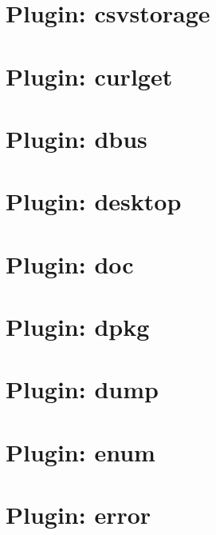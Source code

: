 \documentclass[twoside]{book}
\newcommand{\+}{\discretionary{\mbox{\scriptsize$\hookleftarrow$}}{}{}}
\begin{document}
\chapter{Plugin\+: csvstorage}
\label{md_src_plugins_csvstorage_README}
\hypertarget{md_src_plugins_csvstorage_README}{}

\chapter{Plugin\+: curlget}
\label{md_src_plugins_curlget_README}
\hypertarget{md_src_plugins_curlget_README}{}

\chapter{Plugin\+: dbus}
\label{md_src_plugins_dbus_README}
\hypertarget{md_src_plugins_dbus_README}{}

\chapter{Plugin\+: desktop}
\label{md_src_plugins_desktop_README}
\hypertarget{md_src_plugins_desktop_README}{}

\chapter{Plugin\+: doc}
\label{md_src_plugins_doc_README}
\hypertarget{md_src_plugins_doc_README}{}

\chapter{Plugin\+: dpkg}
\label{md_src_plugins_dpkg_README}
\hypertarget{md_src_plugins_dpkg_README}{}

\chapter{Plugin\+: dump}
\label{md_src_plugins_dump_README}
\hypertarget{md_src_plugins_dump_README}{}

\chapter{Plugin\+: enum}
\label{md_src_plugins_enum_README}
\hypertarget{md_src_plugins_enum_README}{}

\chapter{Plugin\+: error}
\label{md_src_plugins_error_README}
\hypertarget{md_src_plugins_error_README}{}

\end{document}
